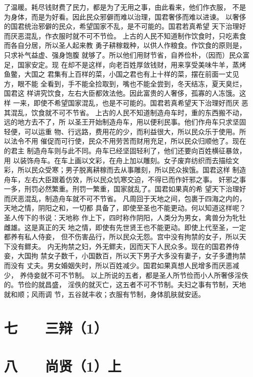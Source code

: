 \documentclass[12pt,UTF8]{ctexbook}
\begin{document}
了温暖。耗尽钱财费了民力，都是为了无用之事，由此看来，他们作衣服， 
不是为身体，而是为好看。因此民众邪僻而难以治理，国君奢侈而难以进谏。 
以奢侈的国君统治邪僻的民众，希望国家不乱，是不可能的。国君若真希望 
天下治理好而厌恶混乱，作衣服时就不可不节俭。 
上古的人民不知道制作饮食时，只吃素食而各自分居，所以圣人起来教 
勇子耕稼栽种，以供人作粮食。作饮食的原则是，只求补气益虚、强身饱腹 
就够了。所以他们用财节省，自养俭朴，（因而）民众富足，国家安定。现 
在却不是这样，向老百姓厚敛钱财，用来享受美味牛羊，蒸烤鱼鳖，大国之 
君集有上百样的菜，小国之君也有上十样的菜，摆在前面一丈见方，眼不能 
全看到，手不能全捡取到，嘴也不能全尝到，冬天结冻，夏天臭烂，国君这 
样讲究饮食，左右大臣都效法他。因此富贵的人奢侈，孤寡的人冻饿。这样 
一来，即使不希望国家混乱，也是不可能的。国君若真希望天下治理好而厌 
恶其混乱，饮食就不可不节省。 
上古的人民不知道制造舟车时，重的东西搬不动，远的地方去不了，所 
以圣王开始制造舟车，用以便利民事。他们作舟车只求坚固轻便，可以运重 
物、行远路，费用花的少，而利益很大，所以民众乐于使用。所以法令不用 
催促而可行使，民众不用劳苦而财用充足，所以民众归顺他了。现在的君主 
制造舟车则与此不同。舟车已经坚固轻利了，他们还要向百姓横征暴敛，用 
以装饰舟车。在车上画以文彩，在舟上加以雕刻。女子废弃纺织而去描绘文 
彩，所以民众受寒；男子脱离耕稼而去从事雕刻，所以民众挨饿。国君这样 
制造舟车，左右大臣跟着仿效，所以民众饥寒交迫，不得已而作奸邪之事。 
奸邪之事一多，刑罚必然繁重。刑罚一繁重，国家就乱了。国君如果真的希 
望天下治理好而厌恶混乱，制造舟车就不可不节省。 
凡周回于天地之间，包裹于四海之内的，天地之情，阴阳之和，一切都 
具备了，即使至圣也不能更动。何以知道这样呢？圣人传下的书说：天地称 
作上下，四时称作阴阳，人类分为男女，禽兽分为牝牡雌雄。这是真正的天 
地之情，即使有先世贤王也不能更动。即使上代至圣，一定都养有私人侍妾， 
但不伤害品行，所以民众无怨。宫中没有拘禁的女子，所以天下没有鳏夫。 
内无拘禁之妇，外无鳏夫，因而天下人民众多。现在的国君养侍妾，大国拘 
禁女子数千，小国数百，所以天下男子大多没有妻子，女子多遭拘禁而没有 
丈夫。男女婚姻失时，所以百姓减少。国君如果真想人民增多而厌恶减少， 
养侍妾就不可不节制。 
以上所说的五者，都是圣人所节俭而小人所奢侈淫佚的。节俭的就昌盛， 
淫佚的就灭亡，这五者不可不节制。夫妇之事有节制，天地就和顺；风雨调 
节，五谷就丰收；衣服有节制，身体肌肤就安适。 

\chapter{七　　三辩（1）}
\chapter{八　　尚贤（1）上}
\end{document}
